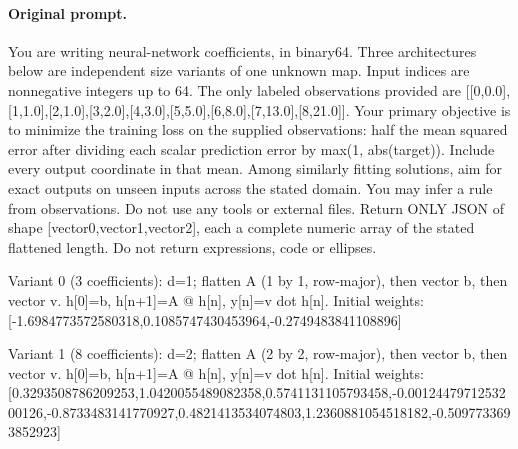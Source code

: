 \paragraph{Original prompt.}
\begingroup\footnotesize\ttfamily\raggedright\setlength{\parindent}{0pt}
You are writing neural-network coefficients,\allowbreak{} in binary64. Three architectures below are independent size variants of one unknown map. Input indices are nonnegative integers up to 64. The only labeled observations provided are [\allowbreak{}[\allowbreak{}0,\allowbreak{}0.0]\allowbreak{},\allowbreak{}[\allowbreak{}1,\allowbreak{}1.0]\allowbreak{},\allowbreak{}[\allowbreak{}2,\allowbreak{}1.0]\allowbreak{},\allowbreak{}[\allowbreak{}3,\allowbreak{}2.0]\allowbreak{},\allowbreak{}[\allowbreak{}4,\allowbreak{}3.0]\allowbreak{},\allowbreak{}[\allowbreak{}5,\allowbreak{}5.0]\allowbreak{},\allowbreak{}[\allowbreak{}6,\allowbreak{}8.0]\allowbreak{},\allowbreak{}[\allowbreak{}7,\allowbreak{}13.0]\allowbreak{},\allowbreak{}[\allowbreak{}8,\allowbreak{}21.0]\allowbreak{}]\allowbreak{}. Your primary objective is to minimize the training loss on the supplied observations: half the mean squared error after dividing each scalar prediction error by max(1,\allowbreak{} abs(target)). Include every output coordinate in that mean. Among similarly fitting solutions,\allowbreak{} aim for exact outputs on unseen inputs across the stated domain. You may infer a rule from observations. Do not use any tools or external files. Return ONLY JSON of shape [\allowbreak{}vector0,\allowbreak{}vector1,\allowbreak{}vector2]\allowbreak{},\allowbreak{} each a complete numeric array of the stated flattened length. Do not return expressions,\allowbreak{} code or ellipses.\par
Variant 0 (3 coefficients): d=1;\allowbreak{} flatten A (1 by 1,\allowbreak{} row-major),\allowbreak{} then vector b,\allowbreak{} then vector v. h[\allowbreak{}0]\allowbreak{}=b,\allowbreak{} h[\allowbreak{}n+1]\allowbreak{}=A @ h[\allowbreak{}n]\allowbreak{},\allowbreak{} y[\allowbreak{}n]\allowbreak{}=v dot h[\allowbreak{}n]\allowbreak{}. Initial weights: [\allowbreak{}-1.6984773572580318,\allowbreak{}0.1085747430453964,\allowbreak{}-0.2749483841108896]\allowbreak{}\par
Variant 1 (8 coefficients): d=2;\allowbreak{} flatten A (2 by 2,\allowbreak{} row-major),\allowbreak{} then vector b,\allowbreak{} then vector v. h[\allowbreak{}0]\allowbreak{}=b,\allowbreak{} h[\allowbreak{}n+1]\allowbreak{}=A @ h[\allowbreak{}n]\allowbreak{},\allowbreak{} y[\allowbreak{}n]\allowbreak{}=v dot h[\allowbreak{}n]\allowbreak{}. Initial weights: [\allowbreak{}0.3293508786209253,\allowbreak{}1.0420055489082358,\allowbreak{}0.5741131105793458,\allowbreak{}-0.0012447971253200126,\allowbreak{}-0.8733483141770927,\allowbreak{}0.4821413534074803,\allowbreak{}1.2360881054518182,\allowbreak{}-0.5097733693852923]\allowbreak{}\par
